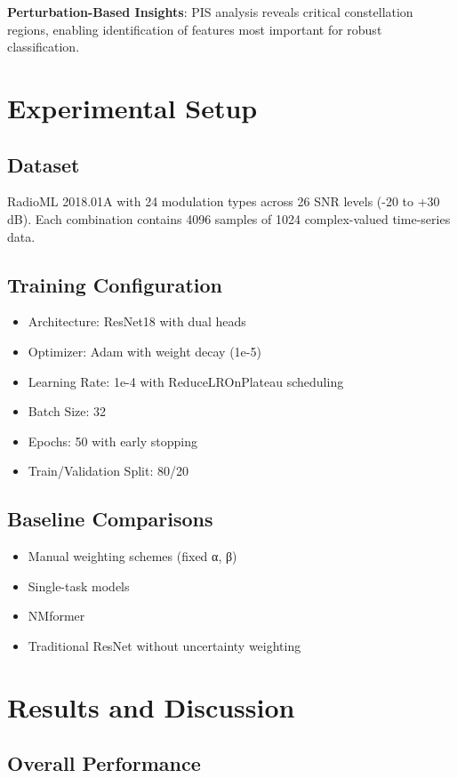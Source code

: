 \documentclass[conference]{IEEEtran}
\begin{document}
\textbf{Perturbation-Based Insights}: PIS analysis reveals critical constellation regions, enabling identification of features most important for robust classification.

\section{Experimental Setup}

\subsection{Dataset}
RadioML 2018.01A with 24 modulation types across 26 SNR levels (-20 to +30 dB). Each combination contains 4096 samples of 1024 complex-valued time-series data.

\subsection{Training Configuration}
\begin{itemize}
\item Architecture: ResNet18 with dual heads
\item Optimizer: Adam with weight decay (1e-5)
\item Learning Rate: 1e-4 with ReduceLROnPlateau scheduling
\item Batch Size: 32
\item Epochs: 50 with early stopping
\item Train/Validation Split: 80/20
\end{itemize}

\subsection{Baseline Comparisons}
\begin{itemize}
\item Manual weighting schemes (fixed α, β)
\item Single-task models
\item NMformer \cite{kong2023nmformer}
\item Traditional ResNet without uncertainty weighting
\end{itemize}

\section{Results and Discussion}

\subsection{Overall Performance}
\end{document}
